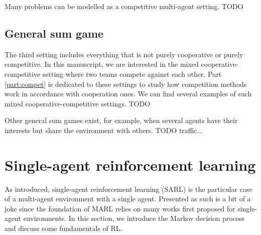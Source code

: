 Many problems can be modelled as a competitive multi-agent setting.
TODO



\subsection{General sum game} 
\label{sec:ch2_general_sum_game}
The third setting includes everything that is not purely cooperative or purely competitive.
In this manuscript, we are interested in the mixed cooperative-competitive setting where two teams compete against each other.
Part \ref{part:compet} is dedicated to these settings to study how competition methods work in accordance with cooperation ones.
We can find several examples of such mixed cooperative-competitive settings.
TODO

Other general sum games exist, for example, when several agents have their interests but share the environment with others.
TODO
traffic...


\section{Single-agent reinforcement learning} 
\label{sec:ch2_single_agent_RL}
As introduced, single-agent reinforcement learning (SARL) is the particular case of a multi-agent environment with a single agent.
Presented as such is a bit of a joke since the foundation of MARL relies on many works first proposed for single-agent environments.
In this section, we introduce the Markov decision process and discuss some fundamentals of RL.

